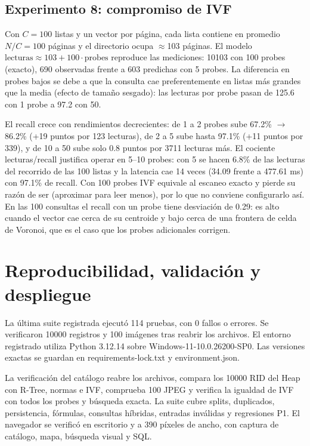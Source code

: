 \documentclass[11pt,a4paper]{article}
\begin{document}
\subsection{Experimento 8: compromiso de IVF}
Con $C=100$ listas y un vector por página, cada lista contiene en promedio $N/C=100$ páginas y el directorio ocupa $\approx$103 páginas. El modelo $\text{lecturas}\approx 103+100\cdot\text{probes}$ reproduce las mediciones: 10103 con 100 probes (exacto), 690 observadas frente a 603 predichas con 5 probes. La diferencia en probes bajos se debe a que la consulta cae preferentemente en listas más grandes que la media (efecto de tamaño sesgado): las lecturas por probe pasan de 125.6 con 1 probe a 97.2 con 50.

El recall crece con rendimientos decrecientes: de 1 a 2 probes sube 67.2\% $\rightarrow$ 86.2\% (+19 puntos por 123 lecturas), de 2 a 5 sube hasta 97.1\% (+11 puntos por 339), y de 10 a 50 sube solo 0.8 puntos por 3711 lecturas más. El cociente lecturas/recall justifica operar en 5--10 probes: con 5 se hacen 6.8\% de las lecturas del recorrido de las 100 listas y la latencia cae 14 veces (34.09 frente a 477.61 ms) con 97.1\% de recall. Con 100 probes IVF equivale al escaneo exacto y pierde su razón de ser (aproximar para leer menos), por lo que no conviene configurarlo así. En las 100 consultas el recall con un probe tiene desviación de 0.29: es alto cuando el vector cae cerca de su centroide y bajo cerca de una frontera de celda de Voronoi, que es el caso que los probes adicionales corrigen.

\clearpage
\section{Reproducibilidad, validación y despliegue}
La última suite registrada ejecutó 114 pruebas, con 0 fallos o errores. Se verificaron 10000 registros y 100 imágenes tras reabrir los archivos. El entorno registrado utiliza Python 3.12.14 sobre Windows-11-10.0.26200-SP0. Las versiones exactas se guardan en requirements-lock.txt y environment.json.

La verificación del catálogo reabre los archivos, compara los 10000 RID del Heap con R-Tree, normas e IVF, comprueba 100 JPEG y verifica la igualdad de IVF con todos los probes y búsqueda exacta. La suite cubre splits, duplicados, persistencia, fórmulas, consultas híbridas, entradas inválidas y regresiones P1. El navegador se verificó en escritorio y a 390 píxeles de ancho, con captura de catálogo, mapa, búsqueda visual y SQL.
\end{document}
